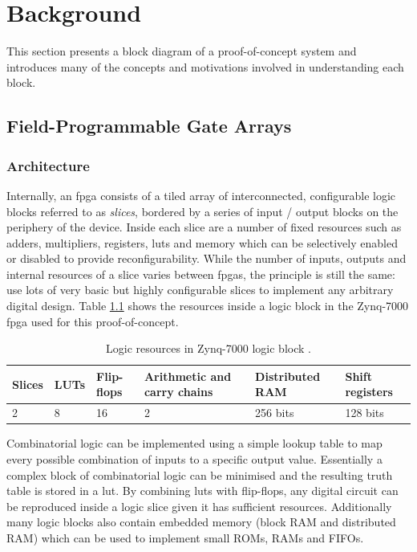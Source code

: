 \chapter{Background}

This section presents a block diagram of a proof-of-concept system and introduces many of the concepts and motivations involved in understanding each block.

\section{Field-Programmable Gate Arrays}

\subsection{Architecture}
Internally, an \gls{fpga} consists of a tiled array of interconnected, configurable logic blocks referred to as \textit{slices}, bordered by a series of input / output blocks on the periphery of the device. Inside each slice are a number of fixed resources such as adders, multipliers, registers, \glspl{lut} and memory which can be selectively enabled or disabled to provide reconfigurability. While the number of inputs, outputs and internal resources of a slice varies between \glspl{fpga}, the principle is still the same: use lots of very basic but highly configurable slices to implement any arbitrary digital design. Table \ref{table:clb_resources} shows the resources inside a logic block in the Zynq-7000 \gls{fpga} used for this proof-of-concept.

\begin{table}
  \centering
  \begin{tabular}{llllll}
      Slices  & LUTs  & Flip-flops    & Arithmetic and carry chains   & Distributed RAM   & Shift registers   \\
      \hline
      2       & 8     & 16            & 2                             & 256 bits          & 128 bits
  \end{tabular}
  \caption{Logic resources in Zynq-7000 logic block \cite{xilinx:ug474}.}
  \label{table:clb_resources}
\end{table}

Combinatorial logic can be implemented using a simple lookup table to map every possible combination of inputs to a specific output value. Essentially a complex block of combinatorial logic can be minimised and the resulting truth table is stored in a \gls{lut}. By combining \glspl{lut} with flip-flops, any digital circuit can be reproduced inside a logic slice given it has sufficient resources. Additionally many logic blocks also contain embedded memory (block RAM and distributed RAM) which can be used to implement small ROMs, RAMs and FIFOs.


